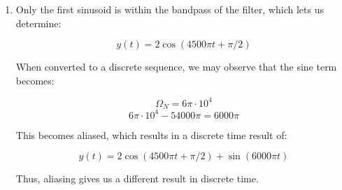 \begin{enumerate}
\begin{enumerate}
      \item Only the first sinusoid is within the bandpass of the filter, which lets us determine:

        $$\boxed{y(t)=2\cos(4500\pi t+\pi/2)}$$
        
        When converted to a discrete sequence, we may observe that the sine term becomes:

        $$\Omega_N=6\pi\cdot10^4$$
        $$6\pi\cdot10^4-54000\pi=6000\pi$$

        This becomes aliased, which results in a discrete time result of:

        $$\boxed{y(t)=2\cos(4500\pi t+ \pi/2)+\sin(6000\pi t)}$$

        Thus, aliasing gives us a different result in discrete time.

    \end{enumerate}

\end{enumerate}



